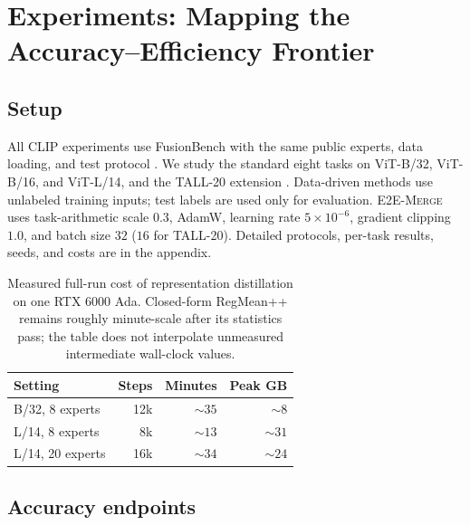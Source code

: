 \documentclass[letterpaper]{article} %
\newcommand{\method}{\textup{\textsc{E2E-Merge}}\xspace}
\theoremstyle{plain}
\theoremstyle{definition}
\begin{document}
\section{Experiments: Mapping the Accuracy--Efficiency Frontier}
\label{sec:experiments}

\subsection{Setup}
All CLIP experiments use FusionBench with the same public experts, data loading, and test protocol \citep{tang2024fusionbench}.
We study the standard eight tasks on ViT-B/32, ViT-B/16, and ViT-L/14, and the TALL-20 extension \citep{ilharco2023taskarithmetic,wang2024tall}.
Data-driven methods use unlabeled training inputs; test labels are used only for evaluation.
\method uses task-arithmetic scale $0.3$, AdamW, learning rate $5\times10^{-6}$, gradient clipping $1.0$, and batch size $32$ ($16$ for TALL-20).
Detailed protocols, per-task results, seeds, and costs are in the appendix.

\begin{table}[tb]
\centering
\small
\setlength{\tabcolsep}{3.5pt}
\begin{tabular*}{\columnwidth}{@{\extracolsep{\fill}}lrrr}
\toprule
Setting & Steps & Minutes & Peak GB \\
\midrule
B/32, 8 experts & 12k & $\sim35$ & $\sim8$ \\
L/14, 8 experts & 8k & $\sim13$ & $\sim31$ \\
L/14, 20 experts & 16k & $\sim34$ & $\sim24$ \\
\bottomrule
\end{tabular*}
\caption{Measured full-run cost of representation distillation on one RTX 6000 Ada.
Closed-form RegMean++ remains roughly minute-scale after its statistics pass; the table does not interpolate unmeasured intermediate wall-clock values.}
\label{tab:measured-cost-main}
\end{table}

\subsection{Accuracy endpoints}
\end{document}
